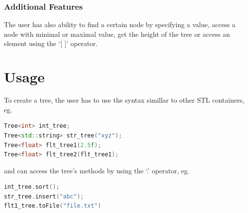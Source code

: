 \documentclass[12pt]{article}
\begin{document}
\subsubsection{Additional Features}
The user has also ability to find a certain node by specifying a value, access a node with minimal or maximal value, get the height of the tree or access an element using the `[  ]' operator.

\section{Usage}
To create a tree, the user has to use the syntax simillar to other STL containers, eg.\
\begin{footnotesize}
\begin{lstlisting}[language=C++]
Tree<int> int_tree;
Tree<std::string> str_tree("xyz");
Tree<float> flt_tree1(2.5f); 
Tree<float> flt_tree2(flt_tree1); 
\end{lstlisting}
\end{footnotesize}

and can access the tree's methods by using the `.' operator, eg.\
\begin{footnotesize}
\begin{lstlisting}[language=C++]
int_tree.sort();
str_tree.insert("abc");
flt1_tree.toFile("file.txt")
\end{lstlisting}
\end{footnotesize}
\end{document}
